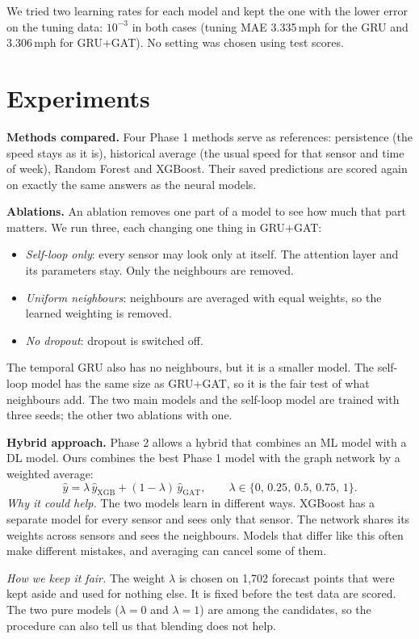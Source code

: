 \documentclass[conference]{IEEEtran}
\begin{document}
We tried two learning rates for each model and kept the one with the lower error on the tuning data: $10^{-3}$ in both cases (tuning MAE 3.335\,mph for the GRU and 3.306\,mph for GRU+GAT). No setting was chosen using test scores.

\section{Experiments}
\textbf{Methods compared.} Four Phase 1 methods serve as references: persistence (the speed stays as it is), historical average (the usual speed for that sensor and time of week), Random Forest and XGBoost. Their saved predictions are scored again on exactly the same answers as the neural models.

\textbf{Ablations.} An ablation removes one part of a model to see how much that part matters. We run three, each changing one thing in GRU+GAT:
\begin{itemize}
\item \emph{Self-loop only}: every sensor may look only at itself. The attention layer and its parameters stay. Only the neighbours are removed.
\item \emph{Uniform neighbours}: neighbours are averaged with equal weights, so the learned weighting is removed.
\item \emph{No dropout}: dropout is switched off.
\end{itemize}
The temporal GRU also has no neighbours, but it is a smaller model. The self-loop model has the same size as GRU+GAT, so it is the fair test of what neighbours add. The two main models and the self-loop model are trained with three seeds; the other two ablations with one.

\textbf{Hybrid approach.} Phase 2 allows a hybrid that combines an ML model with a DL model. Ours combines the best Phase 1 model with the graph network by a weighted average:
\[\hat y=\lambda\,\hat y_{\mathrm{XGB}}+(1-\lambda)\,\hat y_{\mathrm{GAT}},\qquad \lambda\in\{0,\,0.25,\,0.5,\,0.75,\,1\}.\]
\emph{Why it could help.} The two models learn in different ways. XGBoost has a separate model for every sensor and sees only that sensor. The network shares its weights across sensors and sees the neighbours. Models that differ like this often make different mistakes, and averaging can cancel some of them.

\emph{How we keep it fair.} The weight $\lambda$ is chosen on 1,702 forecast points that were kept aside and used for nothing else. It is fixed before the test data are scored. The two pure models ($\lambda=0$ and $\lambda=1$) are among the candidates, so the procedure can also tell us that blending does not help.
\end{document}
